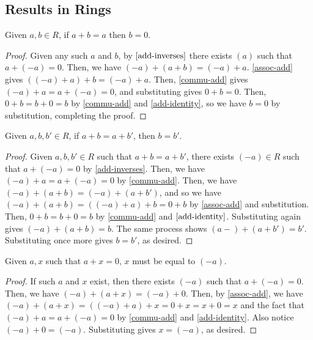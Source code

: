 \subsection{Results in Rings}

\begin{theorem}\label{local-add-identity-is-0}
    Given $a, b \in R$, if $a+b = a$ then $b=0$. 
\end{theorem}
\begin{proof}
    Given any such $a$ and $b$, by $\ref{add-inverses}$ there exists $(a)$ such that $a + (-a) = 0$. Then, we have $(-a) + (a+b) = (-a) + a$. \ref{assoc-add} gives $( (-a) + a) + b = (-a) + a$. Then, \ref{commu-add} gives $(-a) + a = a + (-a) = 0$, and substituting gives $0 + b = 0$. Then, $0 + b = b+0 = b$ by \ref{commu-add} and \ref{add-identity}, so we have $b=0$ by substitution, completing the proof. 
\end{proof}

\begin{theorem}\label{add-left-cancel}
    Given $a, b, b' \in R$, if $a + b = a + b'$, then $b = b'$.
\end{theorem}
\begin{proof}
    Given $a, b, b' \in R$ such that $a+b = a+b'$, there exists $(-a) \in R$ such that $a + (-a) = 0$ by \ref{add-inverses}. Then, we have $(-a) + a = a + (-a) = 0$ by \ref{commu-add}. Then, we have $(-a) + (a+b) = (-a) + (a + b')$, and so we have $(-a) + (a+b) = ((-a)+a)+b = 0 + b$ by \ref{assoc-add} and substitution. Then, $0+b = b+0 = b$ by \ref{commu-add} and $\ref{add-identity}$. Substituting again gives $(-a) + (a+b) = b$. The same process shows $(a-) + (a+b') = b'$. Substituting once more gives $b = b'$, as desired.  
\end{proof}

\begin{theorem}\label{add-inverse-unique}
    Given $a, x$ such that $a+ x = 0$, $x$ must be equal to $(-a)$. 
\end{theorem}
\begin{proof} If such $a$ and $x$ exist, then there exists $(-a)$ such that $a + (-a) = 0$. Then, we have $(-a) + (a+ x) = (-a) + 0$. Then, by \ref{assoc-add}, we have $(-a) + (a+x) = ((-a)+a) + x = 0+x = x+0 = x$ and the fact that $(-a)+a = a + (-a) = 0$ by \ref{commu-add} and \ref{add-identity}. Also notice $(-a) + 0 = (-a)$. Substituting gives $x = (-a)$, as desired.
\end{proof}

